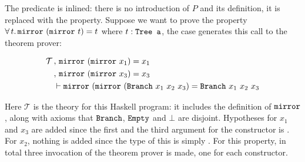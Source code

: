 The predicate is inlined: there is no introduction of $P$ and its
definition, it is replaced with the property. Suppose we want to prove
the property
$\fa{t} \hs{mirror} \w (\hs{mirror} \w t) = t$ where $t : \hs{Tree a}$,
the  case generates this call to the theorem prover:

\begin{align*}
\mathcal{T} \, & , \, \hs{mirror} \w (\hs{mirror} \w x_1) \eq x_1 \\
            \, & , \, \hs{mirror} \w (\hs{mirror} \w x_3) \eq x_3 \\
               &\vdash \hs{mirror} \w (\hs{mirror} \w (\hs{Branch} \w x_1 \w x_2\w x_3) \eq \hs{Branch} \w x_1 \w x_2\w x_3
\end{align*}

Here $\mathcal{T}$ is the theory for this Haskell program: it includes the
definition of $\hs{mirror}$, along with axioms that $\hs{Branch}$,
$\hs{Empty}$ and $\bot$ are disjoint.  Hypotheses for $x_1$ and $x_3$
are added since the first and the third argument for the 
constructor is . For $x_2$, nothing is added since the type
of this is simply .  For this property, in total three
invocation of the theorem prover is made, one for each constructor.

\begin{comment}
    \note{I don't elaborate on this too much since the current
      implementation generates tree of a given depth instead of a given
      number of constructors. Specifying constructors could potentially
      give you less granularity: I need to investigate this}
    To generate theories for the approach in \ref{sec:genind} an algorithm
    was written to generate trees with a number of constructors. For the
    commutativity of plus example, you would start with the expression
    \hs{(x :: Nat,y :: Nat)}, and for each occurrence of a typed variable,
    you replace it with its constructors, and combine. Then an other
    algorithm takes a typed expression, like
    \hs{(Succ (x :: Nat),Succ (y :: Nat))} and returns all expressions
    with less constructors you can generate with the correct type with
    the typed variables, here \hs{(Nat,Nat)}. Then you proceed as in the
    simple case: one invocation to the theorem prover for each step,
    variables are skolemized and the predicate inlined.

    This leads to a combinatorial explosion for a lot of data types. If
    you need to prove something with length $n$ lists, you get a induction
    conclusion $P(x_1\hs{:}x_2\hs{:}\cdots\hs{:}x_n\hs{:}xs)}$, and as there
    are $n!$ combinations of $x_1 \cdots x_n$, making this approach
    unusable for high $n$. A better way would probably to just give you
    all sub trees instead of all possible trees: again, this of course
    depends on what you need to show.
\end{comment}

